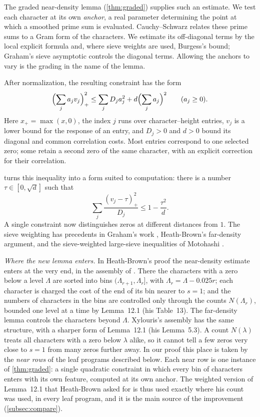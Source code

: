 The graded near-density lemma (\cref{thm:graded}) supplies such an estimate. We test each
character at its own \emph{anchor}, a real parameter determining the point at which a
smoothed prime sum is evaluated. Cauchy--Schwarz relates these prime sums to a Gram form
of the characters. We estimate its off-diagonal terms by the local explicit formula and,
where sieve weights are used, Burgess's bound; Graham's sieve asymptotic controls the
diagonal terms. Allowing the anchors to vary is the grading in the name of the lemma.

After normalization, the resulting constraint has the form
\[
  \Bigl(\sum_j a_jv_j\Bigr)_+^2
  \le \sum_j D_ja_j^2+d\Bigl(\sum_j a_j\Bigr)^2
  \qquad(a_j\ge0).
\]
Here $x_+=\max(x,0)$, the index $j$ runs over character--height entries, $v_j$ is a lower
bound for the response of an entry, and $D_j>0$ and $d>0$ bound its diagonal and common
correlation costs. Most entries correspond to one selected zero; some retain a second zero
of the same character, with an explicit correction for their correlation.

 turns this inequality into a form suited to computation: there is a
number $\tau\in[0,\sqrt d]$ such that
\[
  \sum_j\frac{(v_j-\tau)_+^2}{D_j}\le1-\frac{\tau^2}{d}.
\]
A single constraint now distinguishes zeros at different distances from $1$.
The sieve weighting has precedents in Graham's work
\cite{Graham1977thesis,Graham1981linnik}, Heath-Brown's far-density argument, and the
sieve-weighted large-sieve inequalities of Motohashi \cite{Motohashi1975density}.

\emph{Where the new lemma enters.} In Heath-Brown's proof the near-density estimate enters at the very end, in the assembly of
\cite[\S15]{HeathBrown1992zero}. There the characters with a zero below a level $\Lambda$ are sorted into
bins $(\Lambda_{r+1},\Lambda_r]$, with $\Lambda_r=\Lambda-0.025r$; each character is charged the cost of the end of its
bin nearer to $s=1$; and the numbers of characters in the bins are controlled only through the
counts $N(\Lambda_r)$, bounded one level at a time by Lemma~12.1 (his Table~13). The far-density lemma
controls the characters beyond $\Lambda$. Xylouris's assembly \cite[\S6]{Xylouris2011nullstellen} has the same
structure, with a sharper form of Lemma~12.1 (his Lemma~5.3). A count $N(\lambda)$ treats all characters
with a zero below $\lambda$ alike, so it cannot tell a few zeros very close to $s=1$ from many zeros
further away. In our proof this place is taken by the \emph{near rows} of the leaf programs
described below. Each near row is one instance of \cref{thm:graded}: a single quadratic constraint
in which every bin of characters enters with its own feature, computed at its own anchor. The
weighted version of Lemma~12.1 that Heath-Brown asked for is thus used exactly where his count was
used, in every leaf program, and it is the main source of the improvement
(\cref{subsec:compare}).

